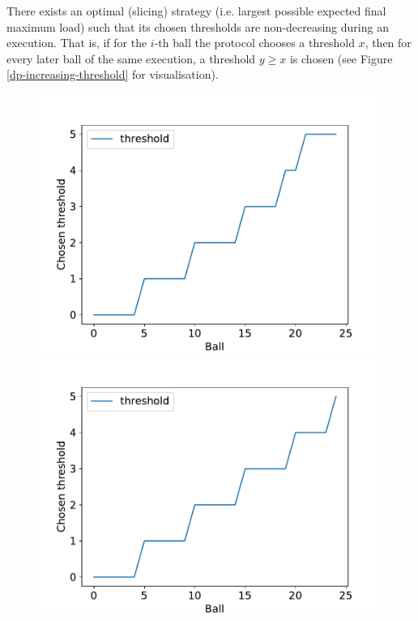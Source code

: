 \begin{conjecture}\label{conjecture: two-thinning-increasing-threshold}
There exists an optimal (slicing) strategy (i.e. largest possible expected final maximum load) such that its chosen thresholds are non-decreasing during an execution. That is, if for the $i$-th ball the protocol chooses a threshold $x$, then for every later ball of the same execution, a threshold $y\geq x$ is chosen (see Figure \ref{dp-increasing-threshold} for visualisation).
\end{conjecture}


\begin{figure}
\centering
\begin{minipage}[t]{.32\linewidth}
  \centering
  \includegraphics[scale=0.36]{Chapter4/Figs/dp_increasing_threshold_1.pdf}
\end{minipage}\hfill
\begin{minipage}[t]{.32\linewidth}
  \centering
  \includegraphics[scale=0.36]{Chapter4/Figs/dp_increasing_threshold_2.pdf}

\end{minipage}
\end{figure}
